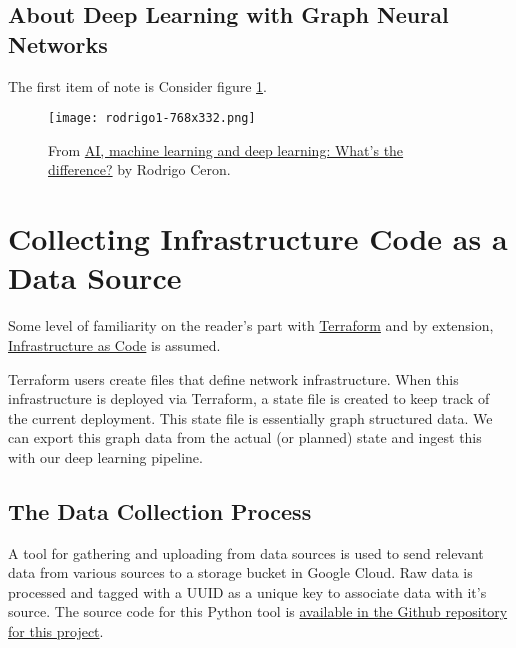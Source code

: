 \subsection{\label{sec:DL}About Deep Learning with Graph Neural Networks}

\justifying
The first item of note is Consider figure \ref{aimldl}.
\vspace{2mm}

\begin{figure}[H]
	\texttt{[image: rodrigo1-768x332.png]}
	\caption{From \href{https://www.ibm.com/blogs/systems/ai-machine-learning-and-deep-learning-whats-the-difference/}{AI, machine learning and deep learning: What’s the difference?} by Rodrigo Ceron.}
	\label{aimldl}
\end{figure}

\section{\label{sec:terraform}Collecting Infrastructure Code as a Data Source}

\justifying
Some level of familiarity on the reader's part with \href{https://www.terraform.io/intro/index.html}{Terraform} and
by extension, \href{https://learn.hashicorp.com/tutorials/terraform/infrastructure-as-code}{Infrastructure as Code} is assumed.
\vspace{2mm}

\justifying
Terraform users create files that define network infrastructure. When this infrastructure is deployed via Terraform, a state file is created to keep track of the current deployment. This state file is essentially graph structured data. We can export this graph data from the actual (or planned) state and ingest this
with our deep learning pipeline.

\subsection{\label{sec:collect}The Data Collection Process}

\justifying
A tool for gathering and uploading from data sources is used to send relevant data
from various sources to a storage bucket in Google Cloud. Raw data is processed and tagged with a UUID as a unique key to associate data with it's source. The
source code for this Python tool is \href{https://github.com/devsecfranklin/model-graph-neural-net/tree/main/src}{available in the Github repository for this project}.
\vspace{2mm}

